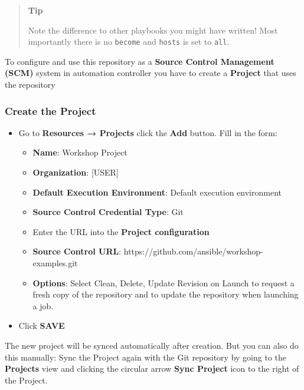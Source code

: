 \begin{quote}
\textbf{Tip}

Note the difference to other playbooks you might have written! Most
importantly there is no \texttt{become} and \texttt{hosts} is set to
\texttt{all}.
\end{quote}

To configure and use this repository as a \textbf{Source Control
Management (SCM)} system in automation controller you have to create a
\textbf{Project} that uses the repository

\hypertarget{create-the-project}{%
\subsubsection{Create the Project}\label{create-the-project}}

\begin{itemize}
\tightlist
\item
  Go to \textbf{Resources → Projects} click the \textbf{Add} button.
  Fill in the form:

        \begin{itemize}
            \item \textbf{Name}: Workshop Project
            \item \textbf{Organization}: [USER]
            \item \textbf{Default Execution Environment}: Default execution environment
            \item \textbf{Source Control Credential Type}: Git
            \item Enter the URL into the \textbf{Project configuration}
            \item \textbf{Source Control URL}: https://github.com/ansible/workshop-examples.git
            \item \textbf{Options}: Select Clean, Delete, Update Revision on Launch to request a fresh copy
of the repository and to update the repository when launching a job.

\end{itemize}
\item
  Click \textbf{SAVE}
\end{itemize}

The new project will be synced automatically after creation. But you can
also do this manually: Sync the Project again with the Git repository by
going to the \textbf{Projects} view and clicking the circular arrow
\textbf{Sync Project} icon to the right of the Project.

